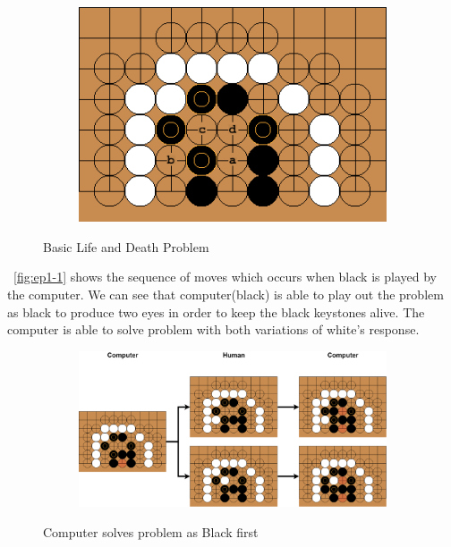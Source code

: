 \documentclass{l4proj}
\begin{document}
\begin{figure}[!ht]
\centering
\begin{subfigure}[b]{0.8\textwidth}
\includegraphics[width=\textwidth]{ep1/1.png}
\end{subfigure}
\caption{Basic Life and Death Problem}
\label{fig:ep1}
\end{figure}

~\autoref{fig:ep1-1} shows the sequence of moves which occurs when black is played by the computer. We can see that computer(black) is able to play out the problem as black to produce two eyes in order to keep the black keystones alive. The computer is able to solve problem with both variations of white’s response.

\begin{figure}[!ht]
\centering
\begin{subfigure}[b]{\textwidth}
\includegraphics[width=\textwidth]{ep1/ep1-1.png}
\end{subfigure}
\caption{Computer solves problem as Black first}
\label{fig:ep1-1}
\end{figure}
\end{document}
